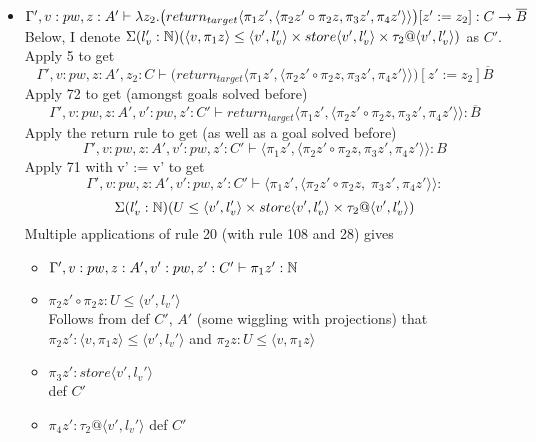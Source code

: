 \documentclass{article}
\begin{document}
\begin{itemize}
\begin{itemize}
\begin{itemize}
    \item $\Gamma', v: pw, z: A' \vdash \lambda z_2. \big(return_{target}\langle \pi_1 z', \langle \pi_2 z' \circ \pi_2 z, \pi_3 z', \pi_4 z' \rangle \rangle \big)[z' := z_2] : C \rightarrow \overline{B}$\\
    Below, I denote $\Sigma(l_v' : \mathbb{N})(\langle v, \pi_1 z\rangle \leq \langle v', l_v' \rangle \times store\langle v', l_v' \rangle \times \tau_2 @ \langle v', l_v' \rangle)$ as $C'$.\\
    Apply 5 to get 
    \[\Gamma', v: pw, z: A', z_2: C \vdash  \big(return_{target}\langle \pi_1 z', \langle \pi_2 z' \circ \pi_2 z, \pi_3 z', \pi_4 z' \rangle \rangle \big)[z' := z_2] \overline{B}\]
    Apply 72 to get (amongst goals solved before)
    \[\Gamma', v: pw, z: A', v': pw, z': C' \vdash  return_{target}\langle \pi_1 z', \langle \pi_2 z' \circ \pi_2 z, \pi_3 z', \pi_4 z' \rangle \rangle: \overline{B}\]
    Apply the return rule to get (as well as a goal solved before)
    \[\Gamma', v: pw, z: A', v': pw, z': C' \vdash 
    \langle \pi_1 z', \langle \pi_2 z' \circ \pi_2 z, \pi_3 z', \pi_4 z' \rangle \rangle : B
    \]
    Apply 71 with v' := v' to get 
     \[\Gamma', v: pw, z: A', v': pw, z': C' \vdash 
    \langle \pi_1 z', \langle \pi_2 z' \circ \pi_2 z,\; \pi_3 z', \pi_4 z' \rangle \rangle :\]
    \[\Sigma(l_v' : \mathbb{N})(U \leq \langle v', l_v' \rangle \times store\langle v', l_v' \rangle \times \tau_2 @ \langle v', l_v' \rangle)
    \]
    Multiple applications of rule 20 (with rule 108 and 28) gives
    \begin{itemize}
        \item $\Gamma', v: pw, z: A', v': pw, z': C' \vdash 
\pi_1 z' : \mathbb{N}$
\item $\pi_2 z' \circ \pi_2 z : U \leq \langle v', l_v' \rangle$\\
Follows from def $C'$, $A'$ (some wiggling with projections)
that $\pi_2 z' : \langle v, \pi_1 z \rangle \leq \langle v', l_v' \rangle$ and $\pi_2 z :U \leq \langle v, \pi_1 z \rangle$
\item $\pi_3 z' : store\langle v', l_v' \rangle $\\
def $C'$
\item $\pi_4 z' : \tau_2 @ \langle v', l_v' \rangle$
def $C'$
    \end{itemize}
\end{itemize}

\end{itemize}

\end{itemize}
\end{document}
